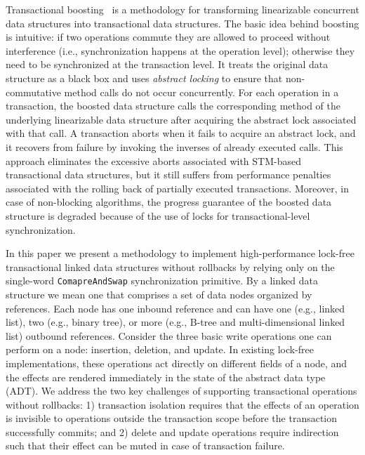\documentclass[10pt,conference,compsocconf]{IEEEtran}
\begin{document}
Transactional boosting~\cite{herlihy2008transactional} is a methodology for transforming linearizable concurrent data structures into transactional data structures.
The basic idea behind boosting is intuitive: if two operations commute they are allowed to proceed without interference (i.e., synchronization happens at the operation level); otherwise they need to be synchronized at the transaction level.
It treats the original data structure as a black box and uses \emph{abstract locking} to ensure that non-commutative method calls do not occur concurrently. 
For each operation in a transaction, the boosted data structure calls the corresponding method of the underlying linearizable data structure after acquiring the abstract lock associated with that call. 
A transaction aborts when it fails to acquire an abstract lock, and it recovers from failure by invoking the inverses of already executed calls. 
This approach eliminates the excessive aborts associated with STM-based transactional data structures, but it still suffers from performance penalties associated with the rolling back of partially executed transactions.
Moreover, in case of non-blocking algorithms, the progress guarantee of the boosted data structure is degraded because of the use of locks for transactional-level synchronization.
 
In this paper we present a methodology to implement high-performance lock-free transactional linked data structures without rollbacks by relying only on the single-word \texttt{ComapreAndSwap} synchronization primitive.
By a linked data structure we mean one that comprises a set of data nodes organized by references. 
Each node has one inbound reference and can have one (e.g., linked list), two (e.g., binary tree), or more (e.g., B-tree and multi-dimensional linked list) outbound references.
Consider the three basic write operations one can perform on a node: insertion, deletion, and update.
In existing lock-free implementations, these operations act directly on different fields of a node, and the effects are rendered immediately in the state of the abstract data type (ADT).
We address the two key challenges of supporting transactional operations without rollbacks: 1) transaction isolation requires that the effects of an operation is invisible to operations outside the transaction scope before the transaction successfully commits; and 2) delete and update operations require indirection such that their effect can be muted in case of transaction failure.
\end{document}
